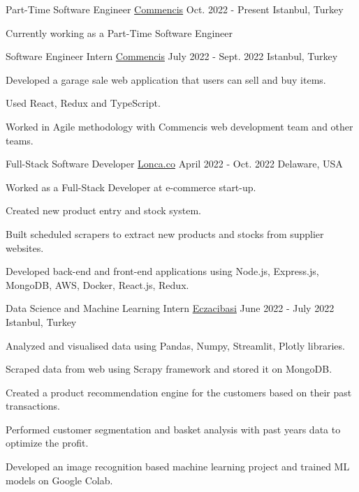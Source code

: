 
\begin{cventries}

  \cventry
    {Part-Time Software Engineer}
    {\href{https://www.commencis.com}{Commencis}}
    {Oct. 2022 - Present}
    {Istanbul, Turkey}
    {
      \begin{cvitems}
        \item {Currently working as a Part-Time Software Engineer}
      \end{cvitems}
    }

  \cventry
    {Software Engineer Intern}
    {\href{https://www.commencis.com}{Commencis}}
    {July 2022 - Sept. 2022}
    {Istanbul, Turkey}
    {
      \begin{cvitems}
        \item {Developed a garage sale web application that users can sell and buy items.}
        \item {Used React, Redux and TypeScript.}
        \item {Worked in Agile methodology with Commencis web development team and other teams.}
      \end{cvitems}
    }

  \cventry
    {Full-Stack Software Developer}
    {\href{https://lonca.co}{Lonca.co}}
    {April 2022 - Oct. 2022}
    {Delaware, USA}
    {
      \begin{cvitems}
        \item {Worked as a Full-Stack Developer at e-commerce start-up.}
        \item {Created new product entry and stock system.}
        \item {Built scheduled scrapers to extract new products and stocks from supplier websites.}
        \item {Developed back-end and front-end applications using Node.js, Express.js, MongoDB, AWS, Docker, React.js, Redux.}
      \end{cvitems}
    }

  \cventry
    {Data Science and Machine Learning Intern}
    {\href{https://www.eczacibasi.com.tr/en/home}{Eczacibasi}}
    {June 2022 - July 2022}
    {Istanbul, Turkey}
    {
      \begin{cvitems}
        \item {Analyzed and visualised data using Pandas, Numpy, Streamlit, Plotly libraries.}
        \item {Scraped data from web using Scrapy framework and stored it on MongoDB.}
        \item {Created a product recommendation engine for the customers based on their past transactions.}
        \item {Performed customer segmentation and basket analysis with past years data to optimize the profit.}
        \item {Developed an image recognition based machine learning project and trained ML models on Google Colab.}
      \end{cvitems}
    }


\end{cventries}
